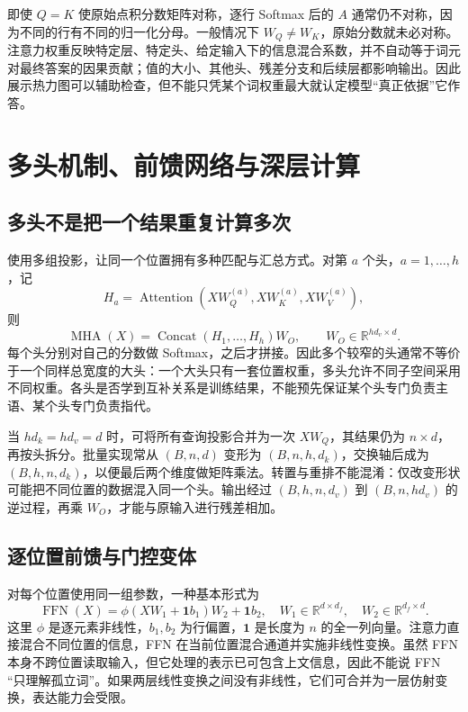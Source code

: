 \documentclass[UTF8,12pt,a4paper,fontset=fandol]{ctexart}
\begin{document}
即使 $Q=K$ 使原始点积分数矩阵对称，逐行 Softmax 后的 $A$ 通常仍不对称，因为不同的行有不同的归一化分母。一般情况下 $W_Q\ne W_K$，原始分数就未必对称。注意力权重反映特定层、特定头、给定输入下的信息混合系数，并不自动等于词元对最终答案的因果贡献；值的大小、其他头、残差分支和后续层都影响输出。因此展示热力图可以辅助检查，但不能只凭某个词权重最大就认定模型“真正依据”它作答。

\section{多头机制、前馈网络与深层计算}
\label{sec:tr-block}

\subsection{多头不是把一个结果重复计算多次}

使用多组投影，让同一个位置拥有多种匹配与汇总方式。对第 $a$ 个头，$a=1,\ldots,h$，记
\[
H_a=\operatorname{Attention}(XW_Q^{(a)},XW_K^{(a)},XW_V^{(a)}),
\]
则
\begin{equation}
\operatorname{MHA}(X)=\operatorname{Concat}(H_1,\ldots,H_h)W_O,
\qquad W_O\in\mathbb R^{hd_v\times d}.
\label{eq:tr-mha}
\end{equation}
每个头分别对自己的分数做 Softmax，之后才拼接。因此多个较窄的头通常不等价于一个同样总宽度的大头：一个大头只有一套位置权重，多头允许不同子空间采用不同权重。各头是否学到互补关系是训练结果，不能预先保证某个头专门负责主语、某个头专门负责指代。

当 $hd_k=hd_v=d$ 时，可将所有查询投影合并为一次 $XW_Q$，其结果仍为 $n\times d$，再按头拆分。批量实现常从 $(B,n,d)$ 变形为 $(B,n,h,d_k)$，交换轴后成为 $(B,h,n,d_k)$，以便最后两个维度做矩阵乘法。转置与重排不能混淆：仅改变形状可能把不同位置的数据混入同一个头。输出经过 $(B,h,n,d_v)$ 到 $(B,n,hd_v)$ 的逆过程，再乘 $W_O$，才能与原输入进行残差相加。

\subsection{逐位置前馈与门控变体}

对每个位置使用同一组参数，一种基本形式为
\begin{equation}
\operatorname{FFN}(X)=\phi(XW_1+\mathbf1b_1)W_2+\mathbf1b_2,
\quad W_1\in\mathbb R^{d\times d_f},\quad W_2\in\mathbb R^{d_f\times d}.
\label{eq:tr-ffn}
\end{equation}
这里 $\phi$ 是逐元素非线性，$b_1,b_2$ 为行偏置，$\mathbf1$ 是长度为 $n$ 的全一列向量。注意力直接混合不同位置的信息，FFN 在当前位置混合通道并实施非线性变换。虽然 FFN 本身不跨位置读取输入，但它处理的表示已可包含上文信息，因此不能说 FFN “只理解孤立词”。如果两层线性变换之间没有非线性，它们可合并为一层仿射变换，表达能力会受限。
\end{document}
